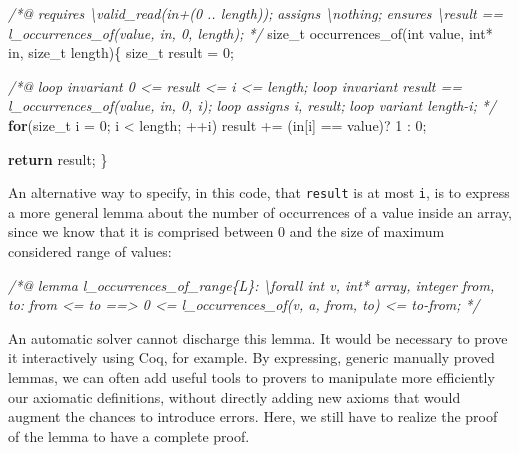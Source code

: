 \documentclass[12pt,francais,]{scrbook}
\newenvironment{Shaded}{}{}
\newcommand{\KeywordTok}[1]{\textcolor[rgb]{0.00,0.44,0.13}{\textbf{{#1}}}}
\newcommand{\DataTypeTok}[1]{\textcolor[rgb]{0.56,0.13,0.00}{{#1}}}
\newcommand{\DecValTok}[1]{\textcolor[rgb]{0.25,0.63,0.44}{{#1}}}
\newcommand{\CommentTok}[1]{\textcolor[rgb]{0.38,0.63,0.69}{\textit{{#1}}}}
\newcommand{\NormalTok}[1]{{#1}}
\begin{document}
\clearpage
\begin{footnotesize}\begin{Shaded}
\begin{Highlighting}[]
\CommentTok{/*@}
\CommentTok{  requires \textbackslash{}valid_read(in+(0 .. length));}
\CommentTok{  assigns  \textbackslash{}nothing;}
\CommentTok{  ensures  \textbackslash{}result == l_occurrences_of(value, in, 0, length);}
\CommentTok{*/}
\NormalTok{size_t occurrences_of(}\DataTypeTok{int} \NormalTok{value, }\DataTypeTok{int}\NormalTok{* in, size_t length)\{}
  \NormalTok{size_t result = }\DecValTok{0}\NormalTok{;}
  
  \CommentTok{/*@}
\CommentTok{    loop invariant 0 <= result <= i <= length;}
\CommentTok{    loop invariant result == l_occurrences_of(value, in, 0, i);}
\CommentTok{    loop assigns i, result;}
\CommentTok{    loop variant length-i;}
\CommentTok{  */}
  \KeywordTok{for}\NormalTok{(size_t i = }\DecValTok{0}\NormalTok{; i < length; ++i)}
    \NormalTok{result += (in[i] == value)? }\DecValTok{1} \NormalTok{: }\DecValTok{0}\NormalTok{;}

  \KeywordTok{return} \NormalTok{result;}
\NormalTok{\}}
\end{Highlighting}
\end{Shaded}\end{footnotesize}

An alternative way to specify, in this code, that \texttt{result} is at
most \texttt{i}, is to express a more general lemma about the number of
occurrences of a value inside an array, since we know that it is
comprised between 0 and the size of maximum considered range of values:

\begin{footnotesize}\begin{Shaded}
\begin{Highlighting}[]
\CommentTok{/*@}
\CommentTok{lemma l_occurrences_of_range\{L\}:}
\CommentTok{  \textbackslash{}forall int v, int* array, integer from, to:}
\CommentTok{    from <= to ==> 0 <= l_occurrences_of(v, a, from, to) <= to-from;}
\CommentTok{*/}
\end{Highlighting}
\end{Shaded}\end{footnotesize}

An automatic solver cannot discharge this lemma. It would be necessary
to prove it interactively using Coq, for example. By expressing, generic
manually proved lemmas, we can often add useful tools to provers to
manipulate more efficiently our axiomatic definitions, without directly
adding new axioms that would augment the chances to introduce errors.
Here, we still have to realize the proof of the lemma to have a complete
proof.
\end{document}
